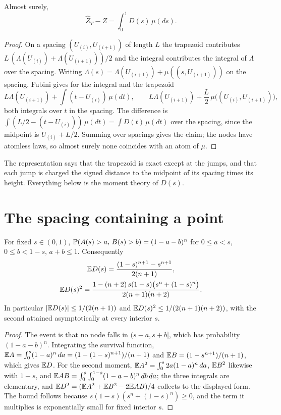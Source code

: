 \begin{theorem}
\label{thm:errrep}
Almost surely,
\[
\hat Z_T - Z = \int_0^1 D(s) \, \mu(ds) .
\]
\end{theorem}

\begin{proof}
On a spacing $(U_{(i)}, U_{(i+1)})$ of length $L$ the trapezoid contributes $L \, (\Lambda(U_{(i)}) + \Lambda(U_{(i+1)})) / 2$ and the integral contributes the integral of $\Lambda$ over the spacing. Writing $\Lambda(s) = \Lambda(U_{(i+1)}) + \mu((s, U_{(i+1)}))$ on the spacing, Fubini gives for the integral and the trapezoid
\[
L \Lambda(U_{(i+1)}) + \int (t - U_{(i)}) \, \mu(dt), \qquad L \Lambda(U_{(i+1)}) + \frac{L}{2} \, \mu\big( (U_{(i)}, U_{(i+1)}) \big) ,
\]
both integrals over $t$ in the spacing. The difference is $\int (L/2 - (t - U_{(i)})) \, \mu(dt) = \int D(t) \, \mu(dt)$ over the spacing, since the midpoint is $U_{(i)} + L/2$. Summing over spacings gives the claim; the nodes have atomless laws, so almost surely none coincides with an atom of $\mu$.
\end{proof}

The representation says that the trapezoid is exact except at the jumps, and that each jump is charged the signed distance to the midpoint of its spacing times its height. Everything below is the moment theory of $D(s)$.

\section{The spacing containing a point}

\begin{lemma}
\label{lem:spacing}
For fixed $s \in (0, 1)$, $\mathbb{P}( A(s) > a, \, B(s) > b ) = (1 - a - b)^n$ for $0 \le a < s$, $0 \le b < 1 - s$, $a + b \le 1$. Consequently
\begin{gather*}
\mathbb{E} D(s) = \frac{ (1-s)^{n+1} - s^{n+1} }{ 2 (n+1) } , \\
\mathbb{E} D(s)^2 = \frac{ 1 - (n+2) \, s (1-s) \big( s^n + (1-s)^n \big) }{ 2 (n+1)(n+2) } .
\end{gather*}
In particular $|\mathbb{E} D(s)| \le 1 / (2(n+1))$ and $\mathbb{E} D(s)^2 \le 1 / (2 (n+1)(n+2))$, with the second attained asymptotically at every interior $s$.
\end{lemma}

\begin{proof}
The event is that no node falls in $(s - a, s + b]$, which has probability $(1 - a - b)^n$. Integrating the survival function, $\mathbb{E} A = \int_0^s (1-a)^n \, da = (1 - (1-s)^{n+1}) / (n+1)$ and $\mathbb{E} B = (1 - s^{n+1}) / (n+1)$, which gives $\mathbb{E} D$. For the second moment, $\mathbb{E} A^2 = \int_0^s 2a (1-a)^n \, da$, $\mathbb{E} B^2$ likewise with $1 - s$, and $\mathbb{E} AB = \int_0^s \int_0^{1-s} (1 - a - b)^n \, db \, da$; the three integrals are elementary, and $\mathbb{E} D^2 = (\mathbb{E} A^2 + \mathbb{E} B^2 - 2 \mathbb{E} AB) / 4$ collects to the displayed form. The bound follows because $s(1-s)(s^n + (1-s)^n) \ge 0$, and the term it multiplies is exponentially small for fixed interior $s$.
\end{proof}

